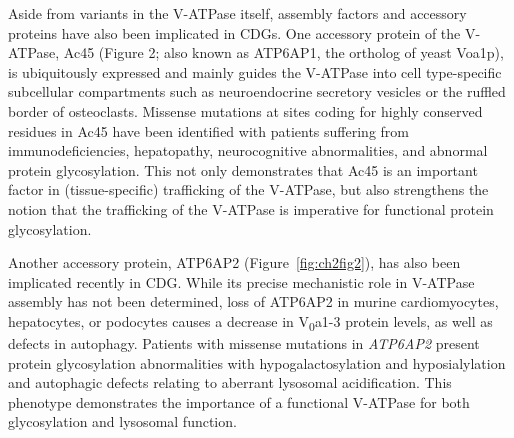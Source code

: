 Aside from variants in the V-ATPase itself, assembly factors and accessory proteins have also been implicated in CDGs. One accessory protein of the V-ATPase, Ac45 (Figure 2; also known as ATP6AP1, the ortholog of yeast Voa1p), is ubiquitously expressed\cite{feng_cytoplasmic_2008,hodi_atp6s1_2002,holthuis_biosynthesis_1999,supek_novel_1994} and mainly guides the V-ATPase into cell type-specific subcellular compartments such as neuroendocrine secretory vesicles\cite{jansen_accessory_2008,jansen_v-atpase-mediated_2010} or the ruffled border of osteoclasts\cite{feng_cytoplasmic_2008,qin_versatile_2011,yang_v-atpase_2012}. Missense mutations at sites coding for highly conserved residues in Ac45 have been identified\cite{jansen_atp6ap1_2016} with patients suffering from immunodeficiencies, hepatopathy, neurocognitive abnormalities, and abnormal protein glycosylation. This not only demonstrates that Ac45 is an important factor in (tissue-specific) trafficking of the V-ATPase, but also strengthens the notion that the trafficking of the V-ATPase is imperative for functional protein glycosylation.

Another accessory protein, ATP6AP2 (Figure~\ref{fig:ch2fig2}), has also been implicated recently in CDG\cite{rujano_mutations_2017}. While its precise mechanistic role in V-ATPase assembly has not been determined, loss of ATP6AP2 in murine cardiomyocytes, hepatocytes, or podocytes causes a decrease in V\textsubscript{0}a1-3 protein levels, as well as defects in autophagy\cite{kinouchi_role_2013,kinouchi_kenichiro_prorenin_2010,kissing_disruption_2017}. Patients with missense mutations in \emph{ATP6AP2} present protein glycosylation abnormalities with hypogalactosylation and hyposialylation and autophagic defects relating to aberrant lysosomal acidification\cite{rujano_mutations_2017}. This phenotype demonstrates the importance of a functional V-ATPase for both glycosylation and lysosomal function.

